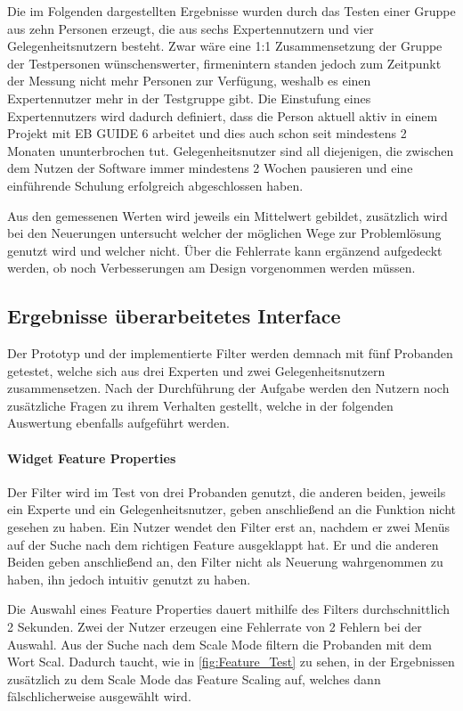 Die im Folgenden dargestellten Ergebnisse wurden durch das Testen einer Gruppe aus zehn Personen erzeugt, die aus sechs Expertennutzern und vier Gelegenheitsnutzern besteht.
Zwar wäre eine 1:1 Zusammensetzung der Gruppe der Testpersonen wünschenswerter, firmenintern standen jedoch zum Zeitpunkt der Messung nicht mehr Personen zur Verfügung, weshalb es einen Expertennutzer mehr in der Testgruppe gibt.
Die Einstufung eines Expertennutzers wird dadurch definiert, dass die Person aktuell aktiv in einem Projekt mit EB GUIDE 6 arbeitet und dies auch schon seit mindestens 2 Monaten ununterbrochen tut.
Gelegenheitsnutzer sind all diejenigen, die zwischen dem Nutzen der Software immer mindestens 2 Wochen pausieren und eine einführende Schulung erfolgreich abgeschlossen haben.

Aus den gemessenen Werten wird jeweils ein Mittelwert gebildet, zusätzlich wird bei den Neuerungen untersucht welcher der möglichen Wege zur Problemlösung genutzt wird und welcher nicht.
Über die Fehlerrate kann ergänzend aufgedeckt werden, ob noch Verbesserungen am Design vorgenommen werden müssen.

\subsection{Ergebnisse überarbeitetes Interface}
Der Prototyp und der implementierte Filter werden demnach mit fünf Probanden getestet, welche sich aus drei Experten und zwei Gelegenheitsnutzern zusammensetzen.
Nach der Durchführung der Aufgabe werden den Nutzern noch zusätzliche Fragen zu ihrem Verhalten gestellt, welche in der folgenden Auswertung ebenfalls aufgeführt werden.

\paragraph{Widget Feature Properties}
Der Filter wird im Test von drei Probanden genutzt, die anderen beiden, jeweils ein Experte und ein Gelegenheitsnutzer, geben anschließend an die Funktion nicht gesehen zu haben.
Ein Nutzer wendet den Filter erst an, nachdem er zwei Menüs auf der Suche nach dem richtigen Feature ausgeklappt hat.
Er und die anderen Beiden geben anschließend an, den Filter nicht als Neuerung wahrgenommen zu haben, ihn jedoch intuitiv genutzt zu haben.

Die Auswahl eines Feature Properties dauert mithilfe des Filters durchschnittlich 2 Sekunden.
Zwei der Nutzer erzeugen eine Fehlerrate von 2 Fehlern bei der Auswahl.
Aus der Suche nach dem Scale Mode filtern die Probanden mit dem Wort \glqq Scal\grqq{}.
Dadurch taucht, wie in \cref{fig:Feature_Test} zu sehen, in der Ergebnissen zusätzlich zu dem Scale Mode das Feature Scaling auf, welches dann fälschlicherweise ausgewählt wird.

